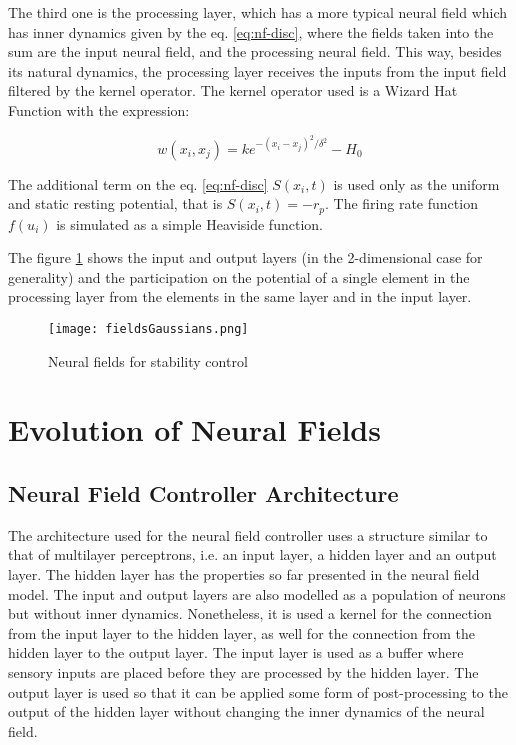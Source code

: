 The third one is the processing layer, which has a more typical neural
field which has inner dynamics given by the eq. \ref{eq:nf-disc},
where the fields taken into the sum are the input neural field, and
the processing neural field. This way, besides its natural dynamics,
the processing layer receives the inputs from the input field filtered
by the kernel operator. The kernel operator used is a Wizard Hat
Function with the expression:

\begin{equation}
  w(x_i,x_j)=ke^{-(x_i-x_j)^2/\delta^2}-H_0
\end{equation}

The additional term on the eq. \ref{eq:nf-disc} $S(x_i,t)$ is used
only as the uniform and static resting potential, that is
$S(x_i,t)=-r_p$.
The firing rate function $f(u_i)$ is simulated as a simple Heaviside
function.

The figure \ref{fig:nf-controller} shows the input and output layers
(in the 2-dimensional case for generality) and the participation on
the potential of a single element in the processing layer from the
elements in the same layer and in the input layer.


\begin{figure}[t]
\label{fig:nf-controller}
\centering
\texttt{[image: fieldsGaussians.png]}
\caption{Neural fields for stability control}
\end{figure}


\section{Evolution of Neural Fields}
\subsection{Neural Field Controller Architecture}
The architecture used for the neural field controller uses a structure
similar to that of multilayer perceptrons, i.e. an input layer, a
hidden layer and an output layer. The hidden layer has the properties
so far presented in the neural field model. The input and output layers are also
modelled as a population of neurons but without inner
dynamics. Nonetheless, it is used a kernel for the connection from the
input layer to the hidden layer, as well for the connection from the
hidden layer to the output layer.
The input layer is used as a buffer where sensory inputs are placed
before they are processed by the hidden layer. The output layer is
used so that it can be applied some form of post-processing to the
output of the hidden layer without changing the inner dynamics of the
neural field.

